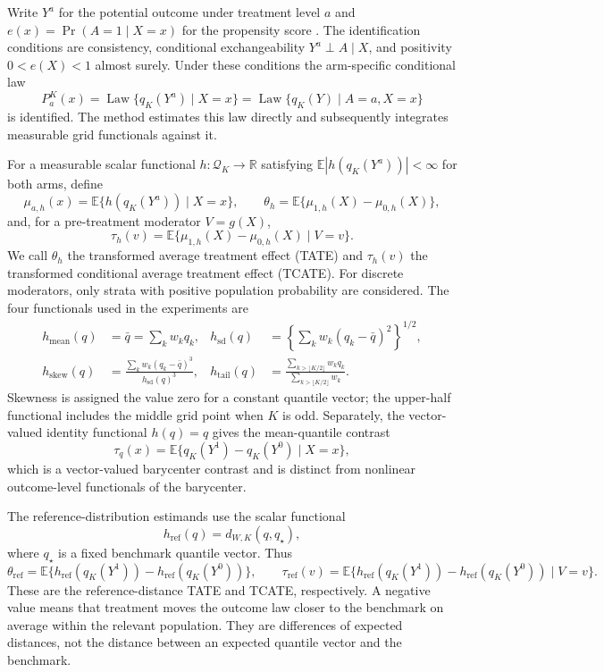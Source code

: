 \documentclass[11pt]{article}
\begin{document}
Write $Y^a$ for the potential outcome under treatment level $a$ and
$e(x)=\Pr(A=1\mid X=x)$ for the propensity score \citep{rosenbaum1983propensity}. The identification
conditions are consistency, conditional exchangeability
$Y^a\perp A\mid X$, and positivity $0<e(X)<1$ almost surely. Under these
conditions the arm-specific conditional law
\[
 P_a^K(x)=\operatorname{Law}\{q_K(Y^a)\mid X=x\}
 =\operatorname{Law}\{q_K(Y)\mid A=a,X=x\}
\]
is identified. The method estimates this law directly and subsequently
integrates measurable grid functionals against it.

For a measurable scalar functional $h:\mathcal{Q}_K\to\mathbb{R}$ satisfying $\mathbb{E}|h(q_K(Y^a))|<\infty$ for both arms, define
\[
 \mu_{a,h}(x)=\mathbb{E}\{h(q_K(Y^a))\mid X=x\},\qquad
 \theta_h=\mathbb{E}\{\mu_{1,h}(X)-\mu_{0,h}(X)\},
\]
and, for a pre-treatment moderator $V=g(X)$,
\[
 \tau_h(v)=\mathbb{E}\{\mu_{1,h}(X)-\mu_{0,h}(X)\mid V=v\}.
\]
We call $\theta_h$ the transformed average treatment effect (TATE) and
$\tau_h(v)$ the transformed conditional average treatment effect (TCATE).
For discrete moderators, only strata with positive population probability are considered.
The four functionals used in the experiments are
\begin{align*}
 h_{\mathrm{mean}}(q)&=\bar q=\sum_k w_kq_k,&
 h_{\mathrm{sd}}(q)&=\left\{\sum_k w_k(q_k-\bar q)^2\right\}^{1/2},\\
 h_{\mathrm{skew}}(q)&=\frac{\sum_k w_k(q_k-\bar q)^3}{h_{\mathrm{sd}}(q)^3},&
 h_{\mathrm{tail}}(q)&=\frac{\sum_{k>\lfloor K/2\rfloor}w_kq_k}{\sum_{k>\lfloor K/2\rfloor}w_k}.
\end{align*}
Skewness is assigned the value zero for a constant quantile vector; the upper-half functional includes the middle grid point when $K$ is odd.
Separately, the vector-valued identity
functional $h(q)=q$ gives the mean-quantile contrast
\[
 \tau_q(x)=\mathbb{E}\{q_K(Y^1)-q_K(Y^0)\mid X=x\},
\]
which is a vector-valued barycenter contrast and is distinct from nonlinear
outcome-level functionals of the barycenter.

The reference-distribution estimands use the scalar functional
\[
 h_{\mathrm{ref}}(q)=d_{W,K}(q,q_\star),
\]
where $q_\star$ is a fixed benchmark quantile vector. Thus
\[
 \theta_{\mathrm{ref}}=\mathbb{E}\{h_{\mathrm{ref}}(q_K(Y^1))
 -h_{\mathrm{ref}}(q_K(Y^0))\},\qquad
 \tau_{\mathrm{ref}}(v)=\mathbb{E}\{h_{\mathrm{ref}}(q_K(Y^1))
 -h_{\mathrm{ref}}(q_K(Y^0))\mid V=v\}.
\]
These are the reference-distance TATE and TCATE, respectively. A negative
value means that treatment moves the outcome law closer to the benchmark on
average within the relevant population. They are differences of expected
distances, not the distance between an expected quantile vector and the
benchmark.
\end{document}

